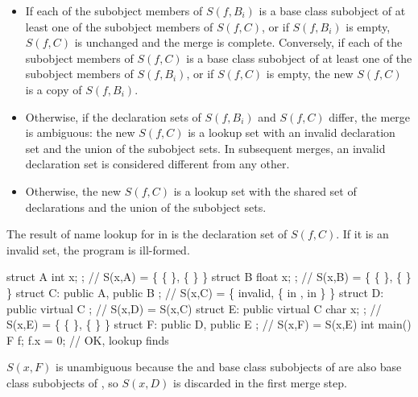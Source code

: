 \begin{itemize}
\item If each of the subobject members of $S(f,B_i)$ is a base class
subobject of at least one of the subobject members of $S(f,C)$, or if
$S(f,B_i)$ is empty, $S(f,C)$ is unchanged and the merge is complete.
Conversely, if each of the subobject members of $S(f,C)$ is a base class
subobject of at least one of the subobject members of $S(f,B_i)$, or if
$S(f,C)$ is empty, the new $S(f,C)$ is a copy of $S(f,B_i)$.

\item Otherwise, if the declaration sets of $S(f,B_i)$ and $S(f,C)$
differ, the merge is ambiguous: the new $S(f,C)$ is a lookup set with an
invalid declaration set and the union of the subobject sets. In
subsequent merges, an invalid declaration set is considered different
from any other.

\item Otherwise, the new $S(f,C)$ is a lookup set with the shared set of
declarations and the union of the subobject sets.
\end{itemize}

\pnum
The result of name lookup for  in  is the declaration
set of $S(f,C)$. If it is an invalid set, the program is ill-formed.
\begin{example}
\begin{codeblock}
struct A { int x; };                    // S(x,A) = \{ \{  \}, \{  \} \}
struct B { float x; };                  // S(x,B) = \{ \{  \}, \{  \} \}
struct C: public A, public B { };       // S(x,C) = \{ invalid, \{  in ,  in  \} \}
struct D: public virtual C { };         // S(x,D) = S(x,C)
struct E: public virtual C { char x; }; // S(x,E) = \{ \{  \}, \{  \} \}
struct F: public D, public E { };       // S(x,F) = S(x,E)
int main() {
  F f;
  f.x = 0;                              // OK, lookup finds 
}
\end{codeblock}

$S(x,F)$ is unambiguous because the  and  base
class subobjects of  are also base class subobjects of , so
$S(x,D)$ is discarded in the first merge step.
\end{example}


